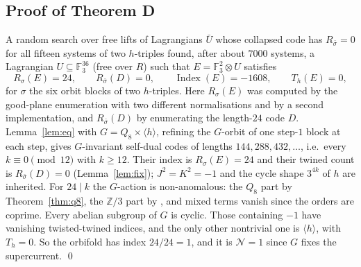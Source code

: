 \documentclass[11pt]{amsart}
\theoremstyle{definition}
\newcommand{\F}{\mathbb{F}_3}
\newcommand{\Index}{\operatorname{Index}}
\begin{document}
\subsection{Proof of Theorem D}\label{sec:D}
A random search over free lifts of Lagrangians $\bar U$ whose collapsed code has $R_{\bar\sigma}=0$ for all
fifteen systems of two $h$-triples found, after about $7000$ systems, a Lagrangian $U\subseteq\F^{36}$
(free over $R$) such that $E=\F^2\otimes U$ satisfies
\[
R_\sigma(E)=24,\qquad R_{\bar\sigma}(D)=0,\qquad \Index(E)=-1608,\qquad T_h(E)=0,
\]
for $\sigma$ the six orbit blocks of two $h$-triples. Here $R_\sigma(E)$ was computed by the good-plane
enumeration with two different normalisations and by a second implementation, and $R_{\bar\sigma}(D)$ by
enumerating the length-$24$ code $D$. Lemma~\ref{lem:eq} with $G=Q_8\times\langle h\rangle$, refining the
$G$-orbit of one step-$1$ block at each step, gives $G$-invariant self-dual codes of lengths
$144,288,432,\dots$, i.e.\ every $k\equiv0\pmod{12}$ with $k\ge12$. Their index is $R_\sigma(E)=24$
\cite[Lemma~5.8]{BR} and their twined count is $R_{\bar\sigma}(D)=0$ (Lemma~\ref{lem:fix}); $J^2=K^2=-1$ and
the cycle shape $3^{4k}$ of $h$ are inherited. For $24\mid k$ the $G$-action is non-anomalous: the $Q_8$ part
by Theorem~\ref{thm:q8}, the $\mathbb Z/3$ part by \cite{GJF}, and mixed terms vanish since the orders are
coprime. Every abelian subgroup of $G$ is cyclic. Those containing $-1$ have vanishing twisted-twined indices,
and the only other nontrivial one is $\langle h\rangle$, with $T_h=0$. So the orbifold has index $24/24=1$, and
it is $\mathcal N=1$ since $G$ fixes the supercurrent.
\qed
\end{document}
